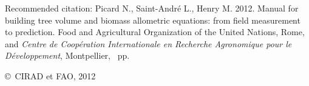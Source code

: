 {\bigskip\noindent Recommended citation: Picard N., Saint-André L., Henry M. 2012. Manual for building tree volume and biomass allometric equations: from field measurement to prediction. Food and Agricultural Organization of the United Nations, Rome, and \textit{Centre de Coopération Internationale en Recherche Agronomique pour le Développement}, Montpellier, \pageref{LastPage}~pp.}

\bigskip\noindent\copyright\ CIRAD et FAO, 2012

\tableofcontents

\listoffigures


\listoftables

